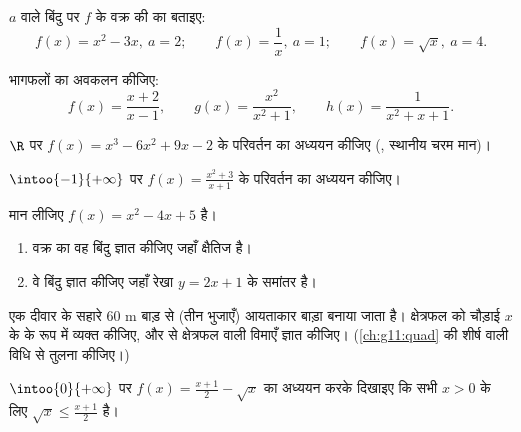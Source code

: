 \begin{exercise}[$\star$]\label{exo:g11:deriv:3}
 $a$ वाले बिंदु पर $f$ के वक्र की  का  बताइए:
\[
f(x) = x^2 - 3x, \ a = 2; \qquad
f(x) = \frac1x, \ a = 1; \qquad
f(x) = \sqrt x, \ a = 4 .
\]
\end{exercise}

\begin{exercise}[$\star$]\label{exo:g11:deriv:4}
भागफलों का अवकलन कीजिए:
\[
f(x) = \frac{x+2}{x-1}, \qquad
g(x) = \frac{x^2}{x^2+1}, \qquad
h(x) = \frac{1}{x^2 + x + 1} .
\]
\end{exercise}

\begin{exercise}[$\star\star$]\label{exo:g11:deriv:5}
$\R$ पर $f(x) = x^3 - 6x^2 + 9x - 2$ के परिवर्तन का अध्ययन कीजिए (, स्थानीय चरम
मान)।
\end{exercise}

\begin{exercise}[$\star\star$]\label{exo:g11:deriv:6}
$\intoo{-1}{+\infty}$ पर $f(x) = \frac{x^2 + 3}{x + 1}$ के परिवर्तन का अध्ययन कीजिए।
\end{exercise}

\begin{exercise}[$\star\star$]\label{exo:g11:deriv:7}
मान लीजिए $f(x) = x^2 - 4x + 5$ है।
\begin{enumerate}
  \item वक्र का वह बिंदु ज्ञात कीजिए जहाँ  क्षैतिज है।
  \item वे बिंदु ज्ञात कीजिए जहाँ  रेखा $y = 2x + 1$ के समांतर है।
\end{enumerate}
\end{exercise}

\begin{exercise}[$\star\star$]\label{exo:g11:deriv:8}
एक दीवार के सहारे $60$ m बाड़ से (तीन भुजाएँ) आयताकार बाड़ा बनाया जाता है।
क्षेत्रफल को चौड़ाई $x$ के  के रूप में व्यक्त कीजिए, और  से
 क्षेत्रफल वाली विमाएँ ज्ञात कीजिए। (\cref{ch:g11:quad} की शीर्ष वाली विधि से तुलना
कीजिए।)
\end{exercise}

\begin{exercise}[$\star\star$]\label{exo:g11:deriv:9}
$\intoo{0}{+\infty}$ पर  $f(x) = \frac{x+1}{2} - \sqrt x$ का अध्ययन करके दिखाइए कि सभी $x > 0$ के लिए $\sqrt{x} \leq \frac{x + 1}{2}$ है।
\end{exercise}

